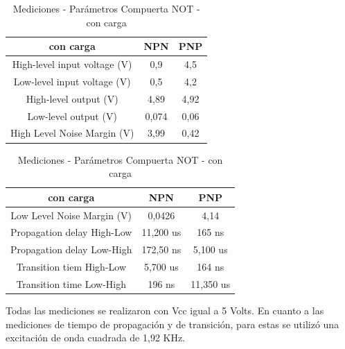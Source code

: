 \begin{center}
\begin{table}[H]
\begin{tabular}{|c|c|c|}
\hline 
con carga & NPN & PNP\tabularnewline
\hline 
\hline 
High-level input voltage (V) & 0,9 & 4,5\tabularnewline
\hline 
Low-level input voltage (V) & 0,5 & 4,2\tabularnewline
\hline 
High-level output (V) & 4,89 & 4,92\tabularnewline
\hline 
Low-level output (V) & 0,074 & 0,06\tabularnewline
\hline 
High Level Noise Margin (V) & 3,99 & 0,42\tabularnewline
\hline 
\end{tabular}\hfill
\begin{tabular}{|c|c|c|}
\hline 
con carga & NPN & PNP\tabularnewline
\hline 
\hline 
Low Level Noise Margin (V) & 0,0426 & 4,14\tabularnewline
\hline 
Propagation delay High-Low & 11,200 us & 165 ns\tabularnewline
\hline 
Propagation delay Low-High & 172,50 ns & 5,100 us\tabularnewline
\hline 
Transition tiem High-Low & 5,700 us & 164 ns\tabularnewline
\hline 
Transition time Low-High & 196 ns & 11,350 us\tabularnewline
\hline 
\end{tabular}
\caption{Mediciones - Parámetros Compuerta NOT - con carga}
\end{table}
\end{center}
Todas las mediciones se realizaron con Vcc igual a 5 Volts. En cuanto
a las mediciones de tiempo de propagación y de transición, para estas
se utilizó una excitación de onda cuadrada de 1,92 KHz.

